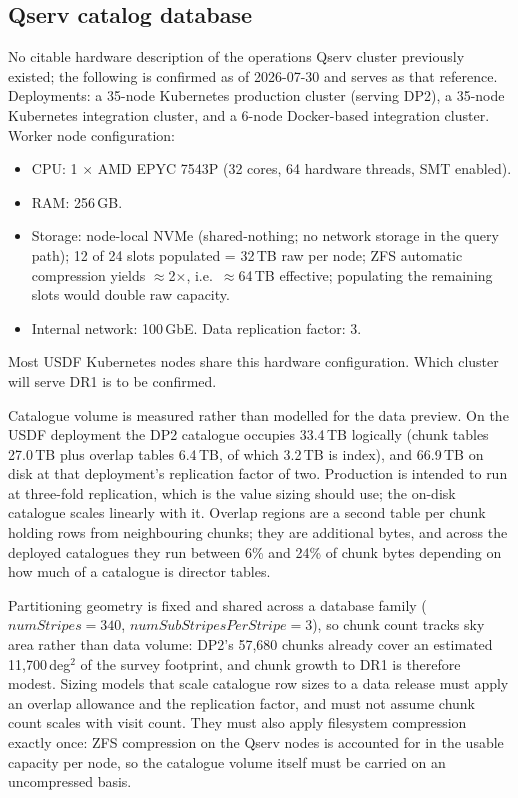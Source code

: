 \subsection{Qserv catalog database}\label{sec:ops2026qserv}

No citable hardware description of the operations Qserv cluster previously
existed; the following is confirmed as of 2026-07-30 and serves as that
reference. Deployments: a 35-node Kubernetes production cluster (serving DP2),
a 35-node Kubernetes integration cluster, and a 6-node Docker-based
integration cluster. Worker node configuration:

\begin{itemize}
\item CPU: 1 $\times$ AMD EPYC 7543P (32 cores, 64 hardware threads,
      SMT enabled).
\item RAM: 256\,GB.
\item Storage: node-local NVMe (shared-nothing; no network storage in the
      query path); 12 of 24 slots populated = 32\,TB raw per node; ZFS
      automatic compression yields $\approx$2$\times$, i.e.\ $\approx$64\,TB
      effective; populating the remaining slots would double raw capacity.
\item Internal network: 100\,GbE. Data replication factor: 3.
\end{itemize}

Most USDF Kubernetes nodes share this hardware configuration. Which cluster
will serve DR1 is to be confirmed.

Catalogue volume is measured rather than modelled for the data preview. On the
USDF deployment the DP2 catalogue occupies 33.4\,TB logically (chunk tables
27.0\,TB plus overlap tables 6.4\,TB, of which 3.2\,TB is index), and
66.9\,TB on disk at that deployment's replication factor of two. Production is
intended to run at three-fold replication, which is the value sizing should use;
the on-disk catalogue scales linearly with it. Overlap regions are
a second table per chunk holding rows from neighbouring chunks; they are
additional bytes, and across the deployed catalogues they run between 6\% and
24\% of chunk bytes depending on how much of a catalogue is director tables.

Partitioning geometry is fixed and shared across a database family
($numStripes = 340$, $numSubStripesPerStripe = 3$), so chunk count tracks sky
area rather than data volume: DP2's 57,680 chunks already cover an estimated
11,700\,deg$^2$ of the survey footprint, and chunk growth to DR1 is therefore
modest. Sizing models that scale catalogue row sizes to a data release must
apply an overlap allowance and the replication factor, and must not assume
chunk count scales with visit count. They must also apply filesystem
compression exactly once: ZFS compression on the Qserv nodes is accounted for
in the usable capacity per node, so the catalogue volume itself must be carried
on an uncompressed basis.

